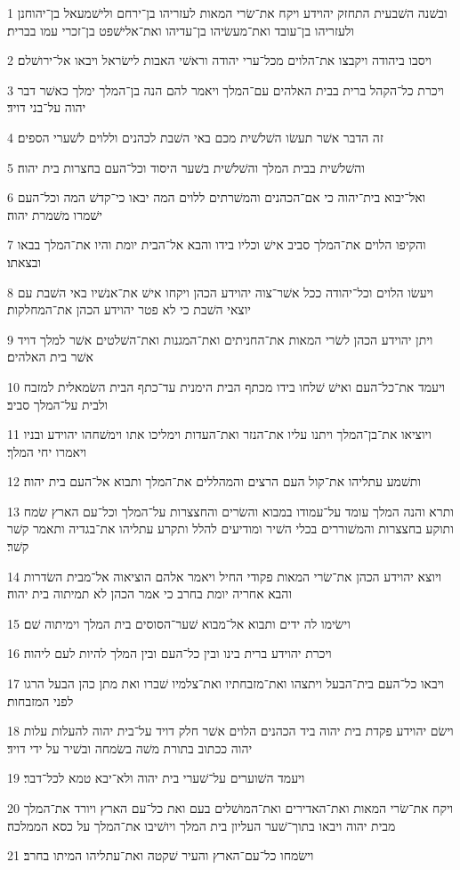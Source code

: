 \par 1 ובשׁנה השׁבעית התחזק יהוידע ויקח את־שׂרי המאות לעזריהו בן־ירחם ולישׁמעאל בן־יהוחנן ולעזריהו בן־עובד ואת־מעשׂיהו בן־עדיהו ואת־אלישׁפט בן־זכרי עמו בברית׃
\par 2 ויסבו ביהודה ויקבצו את־הלוים מכל־ערי יהודה וראשׁי האבות לישׂראל ויבאו אל־ירושׁלם׃
\par 3 ויכרת כל־הקהל ברית בבית האלהים עם־המלך ויאמר להם הנה בן־המלך ימלך כאשׁר דבר יהוה על־בני דויד׃
\par 4 זה הדבר אשׁר תעשׂו השׁלשׁית מכם באי השׁבת לכהנים וללוים לשׁערי הספים׃
\par 5 והשׁלשׁית בבית המלך והשׁלשׁית בשׁער היסוד וכל־העם בחצרות בית יהוה׃
\par 6 ואל־יבוא בית־יהוה כי אם־הכהנים והמשׁרתים ללוים המה יבאו כי־קדשׁ המה וכל־העם ישׁמרו משׁמרת יהוה׃
\par 7 והקיפו הלוים את־המלך סביב אישׁ וכליו בידו והבא אל־הבית יומת והיו את־המלך בבאו ובצאתו׃
\par 8 ויעשׂו הלוים וכל־יהודה ככל אשׁר־צוה יהוידע הכהן ויקחו אישׁ את־אנשׁיו באי השׁבת עם יוצאי השׁבת כי לא פטר יהוידע הכהן את־המחלקות׃
\par 9 ויתן יהוידע הכהן לשׂרי המאות את־החניתים ואת־המגנות ואת־השׁלטים אשׁר למלך דויד אשׁר בית האלהים׃
\par 10 ויעמד את־כל־העם ואישׁ שׁלחו בידו מכתף הבית הימנית עד־כתף הבית השׂמאלית למזבח ולבית על־המלך סביב׃
\par 11 ויוציאו את־בן־המלך ויתנו עליו את־הנזר ואת־העדות וימליכו אתו וימשׁחהו יהוידע ובניו ויאמרו יחי המלך׃
\par 12 ותשׁמע עתליהו את־קול העם הרצים והמהללים את־המלך ותבוא אל־העם בית יהוה׃
\par 13 ותרא והנה המלך עומד על־עמודו במבוא והשׂרים והחצצרות על־המלך וכל־עם הארץ שׂמח ותוקע בחצצרות והמשׁוררים בכלי השׁיר ומודיעים להלל ותקרע עתליהו את־בגדיה ותאמר קשׁר קשׁר׃
\par 14 ויוצא יהוידע הכהן את־שׂרי המאות פקודי החיל ויאמר אלהם הוציאוה אל־מבית השׂדרות והבא אחריה יומת בחרב כי אמר הכהן לא תמיתוה בית יהוה׃
\par 15 וישׂימו לה ידים ותבוא אל־מבוא שׁער־הסוסים בית המלך וימיתוה שׁם׃
\par 16 ויכרת יהוידע ברית בינו ובין כל־העם ובין המלך להיות לעם ליהוה׃
\par 17 ויבאו כל־העם בית־הבעל ויתצהו ואת־מזבחתיו ואת־צלמיו שׁברו ואת מתן כהן הבעל הרגו לפני המזבחות׃
\par 18 וישׂם יהוידע פקדת בית יהוה ביד הכהנים הלוים אשׁר חלק דויד על־בית יהוה להעלות עלות יהוה ככתוב בתורת משׁה בשׂמחה ובשׁיר על ידי דויד׃
\par 19 ויעמד השׁוערים על־שׁערי בית יהוה ולא־יבא טמא לכל־דבר׃
\par 20 ויקח את־שׂרי המאות ואת־האדירים ואת־המושׁלים בעם ואת כל־עם הארץ ויורד את־המלך מבית יהוה ויבאו בתוך־שׁער העליון בית המלך ויושׁיבו את־המלך על כסא הממלכה׃
\par 21 וישׂמחו כל־עם־הארץ והעיר שׁקטה ואת־עתליהו המיתו בחרב׃

